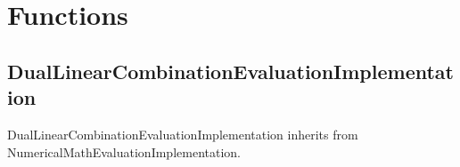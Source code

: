 

\newpage \section{Functions}



\subsection{DualLinearCombinationEvaluationImplementation}

DualLinearCombinationEvaluationImplementation inherits from NumericalMathEvaluationImplementation.

